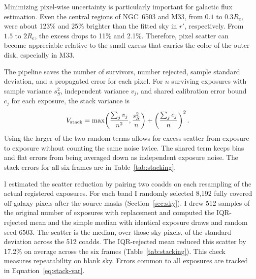 Minimizing pixel-wise uncertainty is particularly important for galactic flux estimation. Even the central regions of NGC~6503 and M33, from $0.1$ to $0.3R_e$, were about 123\% and 25\% brighter than the fitted sky in $r'$, respectively. From $1.5$ to $2R_e$, the excess drops to 11\% and 2.1\%. Therefore, pixel scatter can become appreciable relative to the small excess that carries the color of the outer disk, especially in M33.

The pipeline saves the number of survivors, number rejected, sample standard deviation, and a propagated error for each pixel. For $n$ surviving exposures with sample variance $s_S^2$, independent variance $v_j$, and shared calibration error bound $c_j$ for each exposure, the stack variance is
\begin{equation}
    V_{\rm stack} =
    \max\!\left(\frac{\sum_j v_j}{n^2},\frac{s_S^2}{n}\right)
    +\left(\frac{\sum_j c_j}{n}\right)^2.
    \label{eq:stack-var}
\end{equation}
Using the larger of the two random terms allows for excess scatter from exposure to exposure without counting the same noise twice. The shared term keeps bias and flat errors from being averaged down as independent exposure noise. The stack errors for all six frames are in Table~\ref{tab:stacking}.

I estimated the scatter reduction by pairing two coadds on each resampling of the actual registered exposures. For each band I randomly selected 8,192 fully covered off-galaxy pixels after the source masks (Section~\ref{sec:sky}). I drew 512 samples of the original number of exposures with replacement and computed the IQR-rejected mean and the simple median with identical exposure draws and random seed 6503. The scatter is the median, over those sky pixels, of the standard deviation across the 512 coadds. The IQR-rejected mean reduced this scatter by 17.2\% on average across the six frames (Table~\ref{tab:stacking}). This check measures repeatability on blank sky. Errors common to all exposures are tracked in Equation~\ref{eq:stack-var}.

